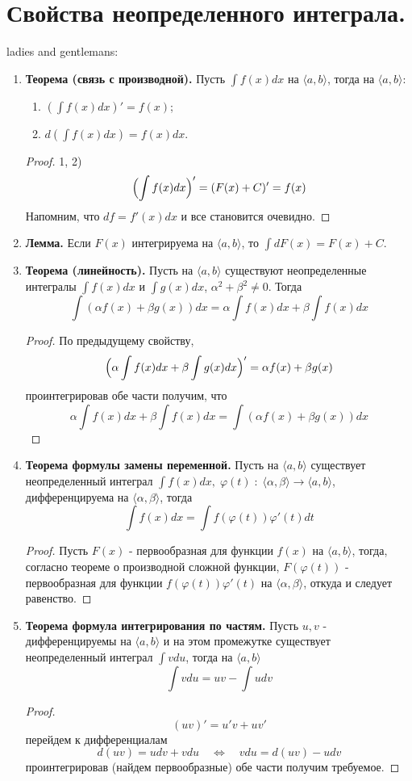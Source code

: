 \documentclass{article}
\newcommand*{\lemma}[1]{\textbf{Лемма.} #1. \newline}
\newcommand*{\theorem}[2]{\textbf{Теорема #1. } #2 \newline}
\begin{document}
\section{Свойства неопределенного интеграла.}
ladies and gentlemans:
\begin{enumerate}
    \item \theorem{(связь с производной)}{Пусть $\int f(x)dx$ на $\langle a, b \rangle$, тогда на $\langle a, b \rangle$: }
    \begin{enumerate}
        \item $(\int f(x)dx)' = f(x)$;
        \item $d(\int f(x)dx) = f(x)dx$.
    \end{enumerate}
    \begin{proof}
        1, 2)
        $$
            \Bigl(\int f(x)dx \Bigr)' = (F(x) + C)' = f(x)
        $$
        Напомним, что $df = f'(x)dx$ и все становится очевидно.
    \end{proof}
    \item \lemma{Если $F(x)$ интегрируема на $\langle a, b \rangle$, то $\int dF(x) = F(x) + C$}
    \item \theorem{(линейность)}{Пусть на $\langle a, b \rangle$ существуют неопределенные интегралы $\int f(x)dx$ и $\int g(x)dx$, $\alpha^2 + \beta^2 \neq 0$. Тогда}
    $$
        \int (\alpha f(x) + \beta g(x))dx = \alpha\int f(x)dx + \beta\int f(x)dx
    $$
    \begin{proof}
        По предыдущему свойству,
        $$
            \Bigl(\alpha \int f(x)dx + \beta \int g(x)dx \Bigr)' = \alpha f(x) + \beta g(x)
        $$
        проинтегрировав обе части получим, что 
        $$  
            \alpha\int f(x)dx + \beta\int f(x)dx = \int (\alpha f(x) + \beta g(x))dx
        $$
    \end{proof}
    \item \theorem{формулы замены переменной}{Пусть на $\langle a, b \rangle$ существует неопределенный интеграл $\int f(x)dx, \; \varphi(t) \; : \; \langle \alpha, \beta \rangle \to \langle a, b \rangle$, дифференцируема на $\langle \alpha, \beta \rangle$, тогда}
    $$
        \int f(x)dx = \int f(\varphi(t))\varphi'(t)dt 
    $$
    \begin{proof}
        Пусть $F(x)$ - первообразная для функции $f(x)$ на $\langle a, b \rangle$, тогда, согласно теореме о производной сложной функции, $F(\varphi(t))$ - первообразная для функции $f(\varphi(t))\varphi'(t)$ на $\langle \alpha, \beta \rangle$, откуда и следует равенство.
    \end{proof}
    \item \theorem{формула интегрирования по частям}{Пусть $u, v$ - дифференцируемы на $\langle a, b \rangle$ и на этом промежутке существует неопределенный интеграл $\int vdu$, тогда на $\langle a, b \rangle$}
    $$
        \int vdu = uv - \int udv
    $$
    \begin{proof}
        $$
            (uv)' = u'v + uv'
        $$
        перейдем к дифференциалам
        $$
            d(uv) = udv + vdu \quad \Leftrightarrow \quad vdu = d(uv) - udv
        $$
        проинтегрировав (найдем первообразные) обе части получим требуемое.
    \end{proof}
\end{enumerate}
\end{document}
